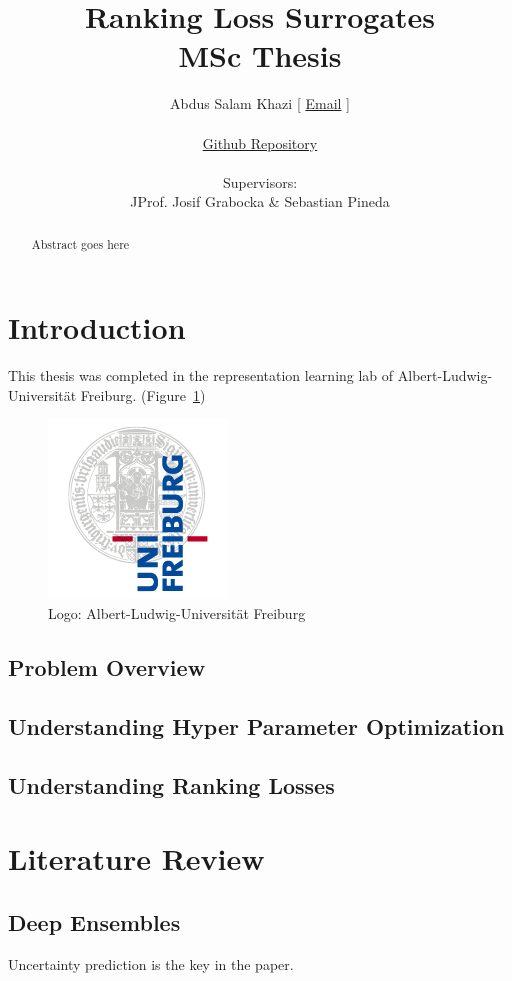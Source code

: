 \documentclass[11pt]{article}
\title {Ranking Loss Surrogates \\[1ex] \large MSc Thesis}
\author{
        Abdus Salam Khazi [
        \href{mailto:abdus.khazi@students.uni-freiburg.de}
                {Email} ]\\ \\
        \href{https://github.com/abduskhazi/ranking-loss-surrogates.git}
                {Github Repository} \cite{github_repository} \\ \\
        Supervisors:
        \begin{tabular}{ll}
             JProf. Josif Grabocka \&
			Sebastian Pineda
		\end{tabular}
       }
\begin{document}
\maketitle
\date{}
\tableofcontents
\newpage

\begin{abstract}

Abstract goes here

\end{abstract}

\newpage

\section{Introduction}

This thesis was completed in the representation learning lab of Albert-Ludwig-Universität Freiburg.  (Figure~\ref{fig:UniLogo})

\begin{figure}[htb]
  \centering
    \includegraphics[scale=0.35]{images/logo}
    \caption{Logo: Albert-Ludwig-Universität Freiburg}
    \label{fig:UniLogo}
\end{figure}

\subsection{Problem Overview}
\label{ProblemOverviewlabel}
\subsection{Understanding Hyper Parameter Optimization}
\subsection{Understanding Ranking Losses}

\section{Literature Review}
\subsection{Deep Ensembles}
Uncertainty prediction is the key in the paper. \cite{DeepEnsemblePaper}
\end{document}
